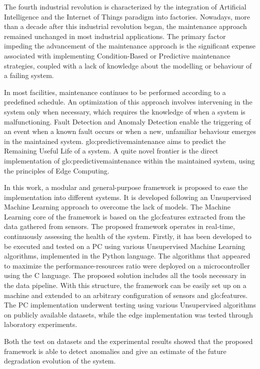 
The fourth industrial revolution is characterized by the integration of Artificial Intelligence and the Internet of Things paradigm into factories. Nowadays, more than a decade after this industrial revolution began, the maintenance approach remained unchanged in most industrial applications. The primary factor impeding the advancement of the maintenance approach is the significant expense associated with implementing Condition-Based or Predictive maintenance strategies, coupled with a lack of knowledge about the modelling or behaviour of a failing system.

In most facilities, maintenance continues to be performed according to a predefined schedule. An optimization of this approach involves intervening in the system only when necessary, which requires the knowledge of when a system is malfunctioning. Fault Detection and Anomaly Detection enable the triggering of an event when a known fault occurs or when a new, unfamiliar behaviour emerges in the maintained system. \gls{glo:predictivemaintenance} aims to predict the Remaining Useful Life of a system. A quite novel frontier is the direct implementation of \gls{glo:predictivemaintenance} within the maintained system, using the principles of Edge Computing.

In this work, a modular and general-purpose framework is proposed to ease the implementation into different systems. It is developed following an Unsupervised Machine Learning approach to overcome the lack of models. The Machine Learning core of the framework is based on the \gls{glo:feature}s extracted from the data gathered from sensors. The proposed framework operates in real-time, continuously assessing the health of the system. Firstly, it has been developed to be executed and tested on a PC using various Unsupervised Machine Learning algorithms, implemented in the Python language. The algorithms that appeared to maximize the performance-resources ratio were deployed on a microcontroller using the C language. The proposed solution includes all the tools necessary in the data pipeline. With this structure, the framework can be easily set up on a machine and extended to an arbitrary configuration of sensors and \gls{glo:feature}s. The PC implementation underwent testing using various Unsupervised algorithms on publicly available datasets, while the edge implementation was tested through laboratory experiments.

Both the test on datasets and the experimental results showed that the proposed framework is able to detect anomalies and give an estimate of the future degradation evolution of the system. 
